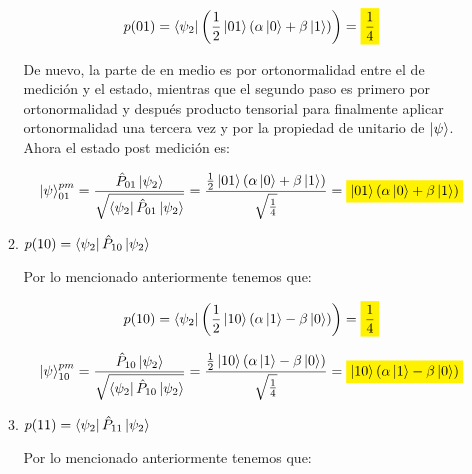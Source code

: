 \begin{itemize}
\begin{enumerate}[label=\arabic*.]
                \[
                    p(01) = \bra{\psi_2}\left(\frac{1}{2} \ket{01}
                    (\alpha\ket{0}+\beta\ket{1})\right) = \mathcolorbox{yellow}{\frac{1}{4}}
                \]

                De nuevo, la parte de en medio es por ortonormalidad entre el de medición y el
                estado, mientras que el segundo paso es primero por ortonormalidad y después
                producto tensorial para finalmente aplicar ortonormalidad una tercera vez y
                por la propiedad de unitario de $\ket{\psi}$. Ahora el estado post medición es:

            \begin{align*}
                \ket{\psi}_{01}^{pm} = \frac{\hat{P}_{01}
                \ket{\psi_2}}{\sqrt{\bra{\psi_2}\hat{P}_{01} \ket{\psi_2}}} =
                \frac{\frac{1}{2} \ket{01}(\alpha\ket{0}+\beta\ket{1}) }{\sqrt{\frac{1}{4}}} =
                \mathcolorbox{yellow}{\ket{01}(\alpha\ket{0}+\beta\ket{1})}
            \end{align*}

            \vspace{.3cm}

            \item $p(10) = \bra{\psi_2} \hat{P}_{10} \ket{\psi_2}$ \vspace{.3cm}

                Por lo mencionado anteriormente tenemos que:

                \[
                    p(10) = \bra{\psi_2}\left(\frac{1}{2} \ket{10}
                    (\alpha\ket{1}-\beta\ket{0})\right) = \mathcolorbox{yellow}{\frac{1}{4}}
                \]

            \begin{align*}
                \ket{\psi}_{10}^{pm} = \frac{\hat{P}_{10}
                \ket{\psi_2}}{\sqrt{\bra{\psi_2}\hat{P}_{10} \ket{\psi_2}}} =
                \frac{\frac{1}{2} \ket{10}(\alpha\ket{1}-\beta\ket{0}) }{\sqrt{\frac{1}{4}}} =
                \mathcolorbox{yellow}{\ket{10}(\alpha\ket{1}-\beta\ket{0})}
            \end{align*}

            \vspace{.3cm}

            \item $p(11) = \bra{\psi_2} \hat{P}_{11} \ket{\psi_2}$ \vspace{.3cm}

                Por lo mencionado anteriormente tenemos que:


\end{enumerate}
\end{itemize}
